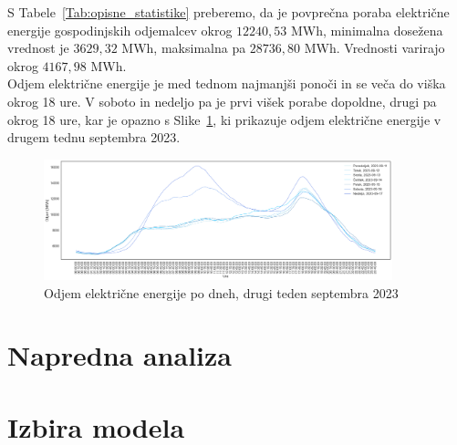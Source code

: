\documentclass[a4paper, 11pt]{article}
\begin{document}
\noindent S Tabele~\ref{Tab:opisne_statistike} preberemo, da je povprečna poraba električne energije gospodinjskih odjemalcev
okrog $12240{,}53 $ MWh, minimalna dosežena vrednost je $3629{,}32$ MWh, maksimalna pa $28736{,}80$ MWh. Vrednosti varirajo
okrog $4167{,}98$ MWh. \\

\noindent Odjem električne energije je med tednom najmanjši ponoči in se veča do viška okrog 18 ure. 
V soboto in nedeljo pa je prvi višek porabe dopoldne, drugi pa okrog 18 ure, kar je opazno s Slike~\ref{fig:odjem_teden}, ki prikazuje odjem 
električne energije v drugem tednu septembra 2023. \\

\begin{figure}[h!]
    \centering
    \caption{Odjem električne energije po dneh, drugi teden septembra 2023}\par\medskip
    \label{fig:odjem_teden}
    \includegraphics[width=0.9\textwidth]{odjem_teden.png}
\end{figure}





\section{Napredna analiza}





\section{Izbira modela}
\end{document}
